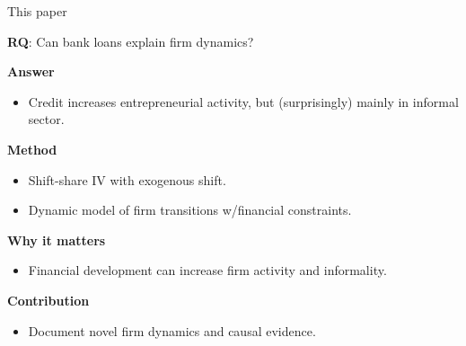 \documentclass[aspectratio=169]{beamer}
\begin{document}


\begin{frame}{This paper}

\begin{center}
    \Large \textbf{RQ}: Can bank loans explain firm dynamics?
\end{center}

\vspace{4mm}
\pause

\textbf{Answer}
\begin{itemize}
    \item Credit increases entrepreneurial activity, but (surprisingly) mainly in informal sector.
\end{itemize}

\vspace{5mm}
\pause

\textbf{Method}
\begin{itemize}
    \item Shift-share IV with exogenous shift.
    \item Dynamic model of firm transitions w/financial constraints.
\end{itemize}

\vspace{5mm}
\pause

\textbf{Why it matters}
\begin{itemize}
    \item Financial development can increase firm activity and informality.
\end{itemize}

\vspace{5mm}
\pause

\textbf{Contribution}
\begin{itemize}
    \item Document novel firm dynamics and causal evidence.
\end{itemize}

\end{frame}

\end{document}
